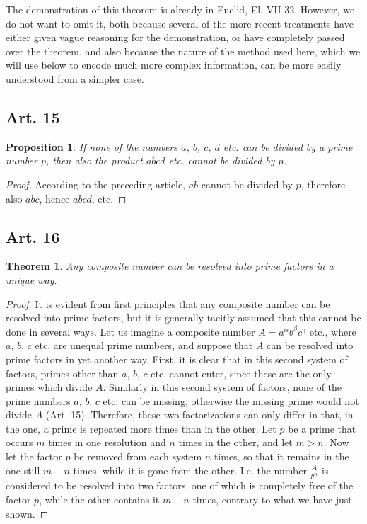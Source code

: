 \documentclass{book}
\theoremstyle{plain}
\newtheorem{theorem}{Theorem}
\newtheorem{proposition}{Proposition}
\theoremstyle{remark}
\begin{document}
The demonstration of this theorem is already in Euclid, El. VII 32.  However, we do not want to omit it, both because several of the more recent treatments have either given vague reasoning for the demonstration, or have completely passed over the theorem, and also because the nature of the method used here, which we will use below to encode much more complex information, can be more easily understood from a simpler case.

\subsection*{Art. 15} 

\begin{proposition} If none of the numbers $a$, $b$, $c$, $d$ etc. can be divided by a prime number $p$, then also the product $abcd$ etc. cannot be divided by $p$. \end{proposition}
\begin{proof} According to the preceding article, $ab$ cannot be divided by $p$, therefore also $abc$, hence $abcd$, etc. \end{proof}

\subsection*{Art. 16}

\begin{theorem} Any composite number can be resolved into prime factors in a unique way. \end{theorem}
\begin{proof} It is evident from first principles that any composite number can be resolved into prime factors, but it is generally tacitly assumed that this cannot be done in several ways.  Let us imagine a composite number $A = a^{\alpha} b^{\beta} c^{\gamma}$ etc., where $a$, $b$, $c$ etc. are unequal prime numbers, and suppose that $A$ can be resolved into prime factors in yet another way.  First, it is clear that in this second system of factors, primes other than $a$, $b$, $c$ etc. cannot enter, since these are the only primes which divide $A$.  Similarly in this second system of factors, none of the prime numbers $a$, $b$, $c$ etc. can be missing, otherwise the missing prime would not divide $A$ (Art. 15).   Therefore, these two factorizations can only differ in that, in the one, a prime is repeated more times than in the other. Let $p$ be a prime that occurs $m$ times in one resolution and $n$ times in the other, and let $m>n$.  Now let the factor $p$ be removed from each system $n$ times, so that it remains in the one still $m-n$ times, while it is gone from the other.  I.e. the number $\frac{A}{p^n}$ is considered to be resolved into two factors, one of which is completely free of the factor $p$, while the other contains it $m-n$ times, contrary to what we have just shown.\end{proof}
\end{document}
